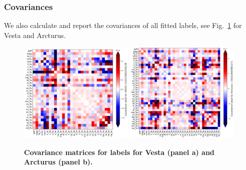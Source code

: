 \documentclass[
  journal=pasa,
  manuscript=research-paper, %
  year=2024,
  volume=37
]{cup-journal}
\begin{document}
%    

\subsubsection{Covariances} \label{sec:uncertainty_covariance}

We also calculate and report the covariances of all fitted labels, see Fig.~\ref{fig:covariance_vesta_arcturus} for Vesta and Arcturus.

\begin{figure}[ht]
 \centering
 \includegraphics[width=0.49\textwidth]{figures/covariance_vesta.png}
 \hfill
 \includegraphics[width=0.49\textwidth]{figures/covariance_arcturus.png}
 \caption{\textbf{Covariance matrices for labels for Vesta (panel a) and Arcturus (panel b).}}
 \label{fig:covariance_vesta_arcturus}
\end{figure}
\end{document}
